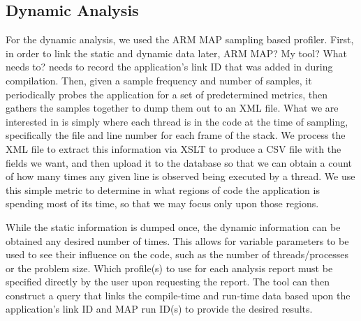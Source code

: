 \subsection{Dynamic Analysis}
\label{sec:dynamic}
For the dynamic analysis, we used the ARM MAP sampling based profiler.
First, in order to link the static and dynamic data later, ARM MAP? My tool? What needs to? needs to record the application's link ID that was added in during compilation.
Then, given a sample frequency and number of samples, it periodically probes the application for a set of predetermined metrics, then gathers the samples together to dump them out to an \acs{XML} file.
What we are interested in is simply where each thread is  in the code at the time of sampling,
specifically the file and line number for each frame of the stack.
We process the \acs{XML} file to extract this information via \ac{XSLT} to produce a \acs{CSV} file with the fields we want, and then upload it to the database so that we can obtain a count of how many times any given line is observed being executed by a thread.
We use this simple metric to determine in what regions of code the application is spending most of its time, so that we may focus only upon those regions.

While the static information is dumped once, the dynamic information can be obtained any desired number of times.
This allows for variable parameters to be used to see their influence on the code, such as the number of threads/processes or the problem size.
Which profile(s) to use for each analysis report must be specified directly by the user upon requesting the report.
The tool can then construct a query that links the compile-time and run-time data based upon the application's link ID and MAP run ID(s) to provide the desired results.
